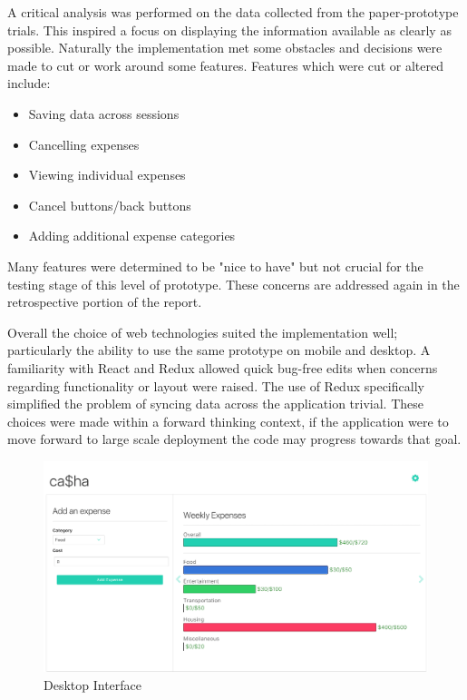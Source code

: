 \documentclass{chi2011}
\begin{document}
    A critical analysis was performed on the data collected from the
    paper-prototype trials. This inspired a focus on displaying the information
    available as clearly as possible. Naturally the implementation met some
    obstacles and decisions were made to cut or work around some features.
    Features which were cut or altered include:

    \begin{itemize}[noitemsep]
        \item Saving data across sessions
        \item Cancelling expenses
        \item Viewing individual expenses
        \item Cancel buttons/back buttons
        \item Adding additional expense categories
    \end{itemize}

    Many features were determined to be "nice to have" but not crucial for the
    testing stage of this level of prototype. These concerns are addressed
    again in the retrospective portion of the report.

    Overall the choice of web technologies suited the implementation well;
    particularly the ability to use the same prototype on mobile and desktop.
    A familiarity with React and Redux allowed quick bug-free edits when
    concerns regarding functionality or layout were raised. The use of Redux
    specifically simplified the problem of syncing data across the application
    trivial. These choices were made within a forward thinking context, if the
    application were to move forward to large scale deployment the code may
    progress towards that goal.

	\begin{figure}[h!]
		\caption{Desktop Interface}
		\includegraphics[width=\linewidth]{desktop-main.png}
	\end{figure}
\end{document}
